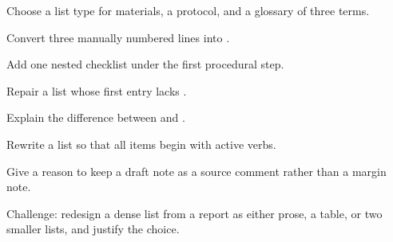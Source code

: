 \chapterexercisestitle
\begin{chapterexercises}
  \item Choose a list type for materials, a protocol, and a glossary of three
        terms.
  \item Convert three manually numbered lines into .
  \item Add one nested checklist under the first procedural step.
  \item Repair a list whose first entry lacks .
  \item Explain the difference between  and .
  \item Rewrite a list so that all items begin with active verbs.
  \item Give a reason to keep a draft note as a source comment rather than a
        margin note.
  \item Challenge: redesign a dense list from a report as either prose, a
        table, or two smaller lists, and justify the choice.
\end{chapterexercises}
